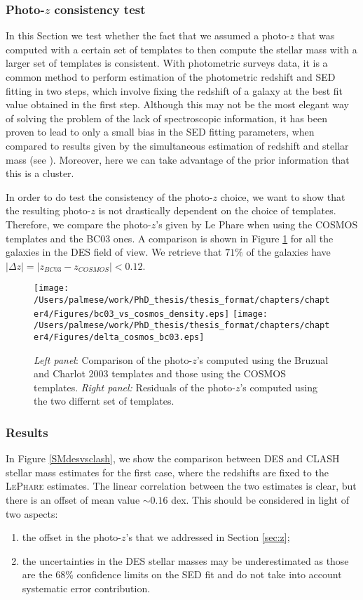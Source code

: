 {\subsubsection{Photo-$z$ consistency test}\label{test}
In this Section we test whether the fact that we assumed a photo-$z$ that was computed with a certain set of templates to then compute the stellar mass with a larger set of templates is consistent. With photometric surveys data, it is a common method to perform estimation of the photometric redshift and SED fitting in two steps, which involve fixing the redshift of a galaxy at the best fit value obtained in the first step. Although this may not be the most elegant way of solving the problem of the lack of spectroscopic information, it has been proven to lead to only a small bias in the SED fitting parameters, when compared to results given by the simultaneous estimation of redshift and stellar mass (see \citealt{acquaviva}). Moreover, here we can take advantage of the prior information that this is a cluster.

In order to do test the consistency of the photo-$z$ choice, we want to show that the resulting photo-$z$ is not drastically dependent on the choice of templates. Therefore, we compare the photo-$z$'s given by Le Phare when using the COSMOS templates and the BC03 ones. A comparison is shown in Figure \ref{bc03vscosmos} for all the galaxies in the DES field of view. We retrieve that $71\%$ of the galaxies have $|\Delta z|=|z_{BC03}-z_{COSMOS}|<0.12$.
\begin{figure}
\texttt{[image: /Users/palmese/work/PhD\_thesis/thesis\_format/chapters/chapter4/Figures/bc03\_vs\_cosmos\_density.eps]}
\texttt{[image: /Users/palmese/work/PhD\_thesis/thesis\_format/chapters/chapter4/Figures/delta\_cosmos\_bc03.eps]}\caption{\emph{Left panel}: Comparison  of the photo-$z$'s computed using the Bruzual and Charlot 2003 templates and those using the COSMOS templates. \emph{Right panel:} Residuals of the photo-$z$'s computed using the two differnt set of templates.}\label{bc03vscosmos}
\end{figure}





\subsubsection{Results}
 In Figure \ref{SMdesvsclash}, we show the comparison between DES and CLASH stellar mass estimates for the first case, where the redshifts are fixed to the \textsc{LePhare} estimates.
 The linear correlation between the two estimates is clear, but there is an offset of mean value $\sim 0.16$ dex. This should be considered in light of two aspects:
\begin{enumerate}
\item the offset in the photo-$z$'s that we addressed in Section \ref{sec:z};
\item the uncertainties in the DES stellar masses may be underestimated as those are the 68\% confidence limits on the SED fit and do not take into account systematic error contribution.
\end{enumerate}

}
